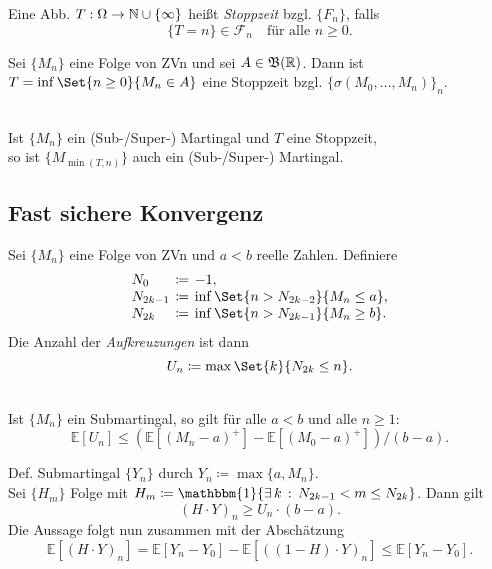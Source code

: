 \documentclass{cheat-sheet}
\newcommand{\E}{\mathbb{E}} %
\newcommand{\ind}{\mathbbm{1}} %
\newcommand{\Bor}{\mathfrak{B}} %
\newcommand{\Filt}{\mathcal{F}} %
\begin{document}
\begin{defn}
  Eine Abb. $T : \Omega \to \mathbb{N} \cup \{ \infty \}$ heißt \emph{Stoppzeit} bzgl. $\{ F_n \}$, falls
  \[
    \{ T=n \} \in \Filt_n
    \quad \text{für alle } n \geq 0.
  \]
\end{defn}

\begin{bsp}
  Sei $\{ M_n \}$ eine Folge von ZVn und sei $A \in \Bor(\R)$.
  Dann ist $T = \inf \Set{n \geq 0}{M_n \in A}$ eine Stoppzeit bzgl. $\{ \sigma(M_0, \ldots, M_n) \}_n$.
\end{bsp}

\begin{samepage}

\begin{satz} \mbox{} \\
  Ist $\{ M_n \}$ ein (Sub-/Super-) Martingal und $T$ eine Stoppzeit, \\
  so ist $\{ M_{\min(T, n)} \}$ auch ein (Sub-/Super-) Martingal.
\end{satz}


\subsection{Fast sichere Konvergenz}

\end{samepage}

Sei $\{ M_n \}$ eine Folge von ZVn und $a < b$ reelle Zahlen.
Definiere
\[
  \arraycolsep=2pt
  \begin{array}{l c l}
    N_0 &\coloneqq& -1, \\
    N_{2k-1} &\coloneqq& \inf \Set{n > N_{2k-2}}{M_n \leq a}, \\
    N_{2k} &\coloneqq& \inf \Set{n > N_{2k-1}}{M_n \geq b}.
  \end{array}
\]
Die Anzahl der \textit{Aufkreuzungen} ist dann
\[
  U_n \coloneqq \max \Set{k}{N_{2k} \leq n}.
\]

\begin{satz} \mbox{}\\
  Ist $\{ M_n \}$ ein Submartingal, so gilt für alle $a < b$ und alle $n \geq 1$:
  \[ \E[ U_n ] \leq (\E[ (M_n - a)^{+} ] - \E[ (M_0 - a)^{+} ]) / (b - a). \]
\end{satz}

\begin{beweisskizze}
  Def. Submartingal $\{ Y_n \}$ durch $Y_n \coloneqq \max \{ a, M_n \}$. \\
  Sei $\{ H_m \}$ Folge mit $H_m \coloneqq \ind \{ \ex{k} N_{2k-1} < m \leq N_{2k} \}$.
  Dann gilt
  \[ (H \cdot Y)_n \geq U_n \cdot (b - a). \]
  Die Aussage folgt nun zusammen mit der Abschätzung
  \[ \E[(H \cdot Y)_n] = \E[Y_n - Y_0] - \E[((1-H) \cdot Y)_n] \leq \E[Y_n - Y_0]. \]
\end{beweisskizze}
\end{document}
